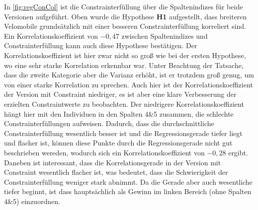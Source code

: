 In \cref{fig:regConCol} ist die Constrainterfüllung über die Spaltenindizes für beide Versionen aufgeführt.
Oben wurde die Hypothese \textbf{H1} aufgestellt, dass breiteren Velomobile grundsätzlich mit einer besseren Constrainterfüllung korreliert sind.
Ein Korrelationskoeffizient von $-0,47$ zwischen Spaltenindizes und Constrainterfüllung kann auch diese Hypothese bestätigen.
Der Korrelationskoeffizient ist hier zwar nicht so groß wie bei der ersten Hypothese, wo eine sehr starke Korrelation erkennbar war.
Unter Beachtung der Tatsache, dass die zweite Kategorie aber die Varianz erhöht, ist er trotzdem groß genug, um von einer starke Korrelation zu sprechen.
Auch hier ist der Korrelationskoeffizient der Version mit Constraint niedriger, es ist aber eine klare Verbesserung der erzielten Constraintwerte zu beobachten.
Der niedrigere Korrelationskoeffizient hängt hier mit den Individuen in den Spalten 4\&5 zusammen, die schlechte Constrainterfüllungen aufweisen.
Dadurch, dass die durchschnittliche Constrainterfüllung wesentlich besser ist und die Regressionsgerade tiefer liegt und flacher ist, können diese Punkte durch die Regressionsgerade nicht gut beschrieben wereden, wodurch sich ein Korrelationskoeffizient von $-0,28$ ergibt.
Daneben ist interessant, dass die Korrelationsgerade in der Version mit Constraint wesentlich flacher ist, was bedeutet, dass die Schwierigkeit der Constrainterfüllung weniger stark abnimmt.
Da die Gerade aber auch wesentliche tiefer beginnt, ist dass hauptsächlich als Gewinn im linken Bereich (ohne Spalten 4\&5) einzuordnen.

